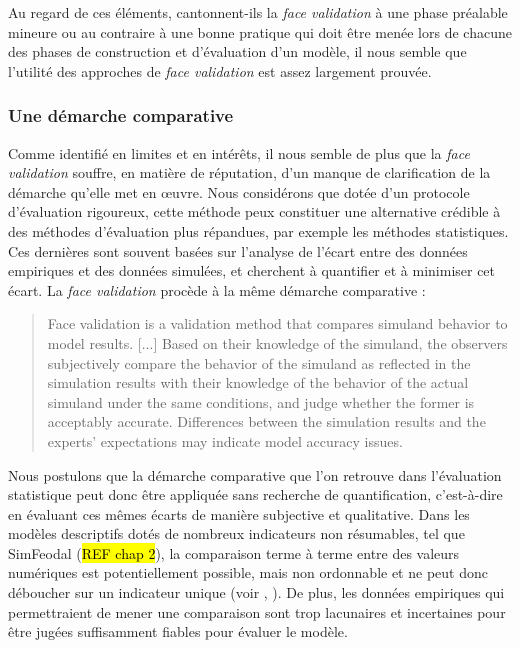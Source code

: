 Au regard de ces éléments, cantonnent-ils la \textit{face validation} à une phase préalable mineure ou au contraire à une bonne pratique qui doit être menée lors de chacune des phases de construction et d'évaluation d'un modèle, il nous semble que l'utilité des approches de \textit{face validation} est assez largement prouvée.

\subsubsection{Une démarche comparative}
Comme identifié en limites et en intérêts, il nous semble de plus que la \textit{face validation} souffre, en matière de réputation, d'un manque de clarification de la démarche qu'elle met en œuvre.
Nous considérons que dotée d'un protocole d'évaluation rigoureux, cette méthode peux constituer une alternative crédible à des méthodes d'évaluation plus répandues, par exemple les méthodes statistiques.
Ces dernières sont souvent basées sur l'analyse de l'écart entre des données empiriques et des données simulées, et cherchent à quantifier et à minimiser cet écart.
La \textit{face validation} procède à la même démarche comparative :
\begin{quotation}
		\noindent \og Face validation is a validation method that compares simuland behavior to model results. [...] Based on their knowledge of the simuland, the observers subjectively compare the behavior of the simuland as reflected in the simulation results with their knowledge of the behavior of the actual simuland under the same conditions, and judge whether the former is acceptably accurate. Differences between the simulation results and the experts' expectations may indicate model accuracy issues.
	\mbox{}~ \hfill \textcite[341]{petty2010verification}
\end{quotation}
Nous postulons que la démarche comparative que l'on retrouve dans l'évaluation statistique peut donc être appliquée sans recherche de quantification, c'est-à-dire en évaluant ces mêmes écarts de manière subjective et qualitative.
Dans les modèles descriptifs dotés de nombreux indicateurs non résumables, tel que SimFeodal (\hl{REF chap 2}), la comparaison terme à terme entre des valeurs numériques est potentiellement possible, mais non ordonnable et ne peut donc déboucher sur un indicateur unique (voir , ).
De plus, les données empiriques qui permettraient de mener une comparaison sont trop lacunaires et incertaines pour être jugées suffisamment fiables pour évaluer le modèle.

